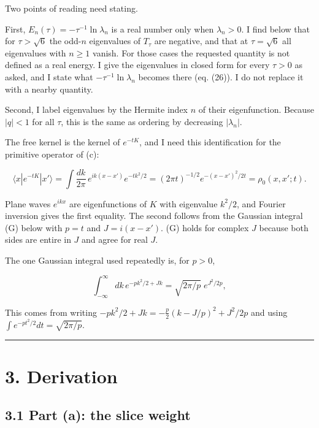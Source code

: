 \documentclass[11pt,a4paper]{article}
\newcommand{\tagmark}[1]{\marginnote{\scriptsize\ttfamily #1}}
\newcommand{\Dtag}{\tagmark{[D]}}   %
\begin{document}
Two points of reading need stating.

First, \(E_n(\tau) = -\tau^{-1}\ln\lambda_n\) is a real number only when
\(\lambda_n > 0\). I find below that for \(\tau>\sqrt6\) the odd-\(n\)
eigenvalues of \(T_\tau\) are negative, and that at \(\tau=\sqrt6\) all
eigenvalues with \(n\ge1\) vanish. For those cases the requested
quantity is not defined as a real energy. I give the eigenvalues in
closed form for every \(\tau>0\) as asked, and I state what
\(-\tau^{-1}\ln\lambda_n\) becomes there (eq. (26)). I do not replace it
with a nearby quantity.

Second, I label eigenvalues by the Hermite index \(n\) of their
eigenfunction. Because \(|q|<1\) for all \(\tau\), this is the same as
ordering by decreasing \(|\lambda_n|\).

The free kernel is the kernel of \(e^{-tK}\), and I need this
identification for the primitive operator of (c):

\[
\langle x|e^{-tK}|x'\rangle = \int\frac{dk}{2\pi}\,e^{ik(x-x')}e^{-tk^2/2} = (2\pi t)^{-1/2}e^{-(x-x')^2/2t} = \rho_0(x,x';t). \tag{0}
\]

\Dtag{} Plane waves \(e^{ikx}\) are eigenfunctions of \(K\) with
eigenvalue \(k^2/2\), and Fourier inversion gives the first equality.
The second follows from the Gaussian integral (G) below with \(p=t\) and
\(J = i(x-x')\). (G) holds for complex \(J\) because both sides are
entire in \(J\) and agree for real \(J\).

The one Gaussian integral used repeatedly is, for \(p>0\),

\[
\int_{-\infty}^{\infty}dk\,e^{-pk^2/2 + Jk} = \sqrt{2\pi/p}\;e^{J^2/2p}, \tag{G}
\]

\Dtag{} This comes from writing
\(-pk^2/2+Jk = -\tfrac p2(k - J/p)^2 + J^2/2p\) and using
\(\int e^{-pt^2/2}dt = \sqrt{2\pi/p}\).

\begin{center}\rule{0.5\linewidth}{0.5pt}\end{center}

\hypertarget{derivation}{%
\section{3. Derivation}\label{derivation}}

\hypertarget{part-a-the-slice-weight}{%
\subsection{3.1 Part (a): the slice
weight}\label{part-a-the-slice-weight}}
\end{document}
